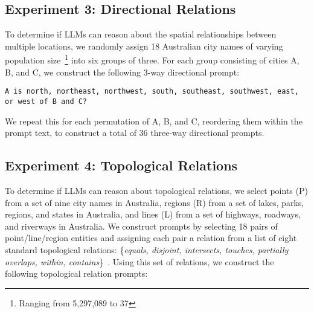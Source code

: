 \subsection{Experiment 3: Directional Relations}


To determine if LLMs can reason about the spatial relationships between multiple locations, we randomly assign 18 Australian city names of varying population size~\footnote{Ranging from 5,297,089 to 37} into six groups of three.
For each group consisting of cities A, B, and C, we construct the following 3-way directional prompt: 

\begin{lstlisting}[title=Prompt 6: 3-way Directional Prompt]
    A is north, northeast, northwest, south, southeast, southwest, east, or west of B and C?
\end{lstlisting}





We repeat this for each permutation of A, B, and C, reordering them within the prompt text, to construct a total of 36 three-way directional prompts.



\subsection{Experiment 4: Topological Relations}


To determine if LLMs can reason about topological relations, we select points (P) from a set of nine city names in Australia, regions (R) from a set of lakes, parks, regions, and states in Australia, and lines (L) from a set of highways, roadways, and riverways in Australia.
We construct prompts by selecting 18 pairs of point/line/region entities and assigning each pair a relation from a list of eight standard topological relations: \{\textit{equals, disjoint, intersects, touches, partially overlaps, within, contains}\}~\cite{Carniel2023}.
Using this set of relations, we construct the following topological relation prompts:

